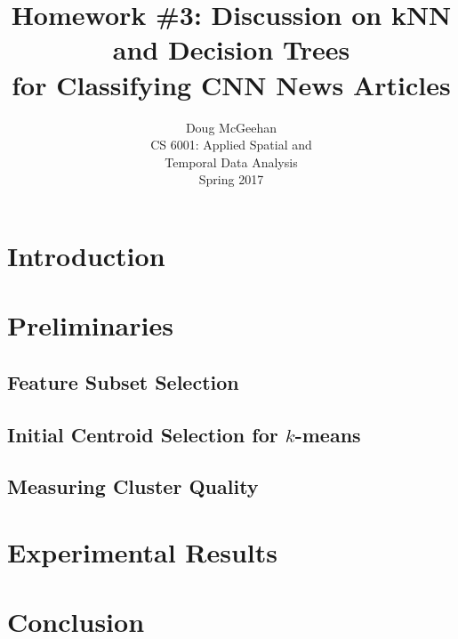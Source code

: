 \documentclass[11pt]{article}
\title{Homework \#3: Discussion on kNN and Decision Trees\\ for Classifying CNN News Articles}
\author{Doug McGeehan\\
		CS 6001: Applied Spatial and \\ Temporal Data Analysis\\
		Spring 2017}
\begin{document}
\maketitle

\section{Introduction}

\section{Preliminaries}

\subsection{Feature Subset Selection}

\subsection{Initial Centroid Selection for $k$-means}

\subsection{Measuring Cluster Quality}

\section{Experimental Results}





\section{Conclusion}


{}

\end{document}
